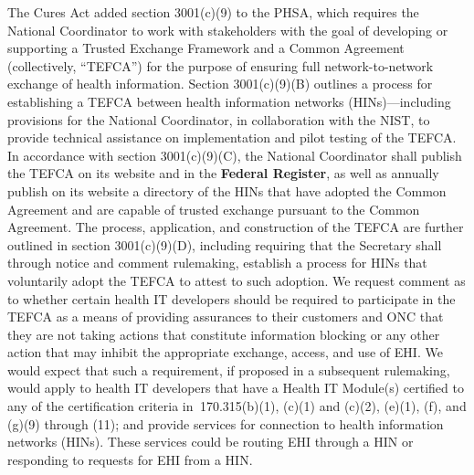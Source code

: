 \documentclass[twoside,11pt]{article}
\begin{document}
          The Cures Act added section 3001(c)(9) to the PHSA, which requires the National Coordinator to work with stakeholders with the goal of developing or supporting a Trusted Exchange Framework and a Common Agreement (collectively, “TEFCA”) for the purpose of ensuring full network-to-network exchange of health information. Section 3001(c)(9)(B) outlines a process for establishing a TEFCA between health information networks (HINs)—including provisions for the National Coordinator, in collaboration with the NIST, to provide technical assistance on implementation and pilot testing of the TEFCA. In accordance with section 3001(c)(9)(C), the National Coordinator shall publish the TEFCA on its website and in the \textbf{Federal Register}, as well as annually publish on its website a directory of the HINs that have adopted the Common Agreement and are capable of trusted exchange pursuant to the Common Agreement. The process, application, and construction of the  \ifhmode\expandafter\xspace\fi TEFCA are further outlined in section 3001(c)(9)(D), including requiring that the Secretary shall through notice and comment rulemaking, establish a process for HINs that voluntarily adopt the TEFCA to attest to such adoption. We request comment as to whether certain health IT developers should be required to participate in the TEFCA as a means of providing assurances to their customers and ONC that they are not taking actions that constitute information blocking or any other action that may inhibit the appropriate exchange, access, and use of EHI. We would expect that such a requirement, if proposed in a subsequent rulemaking, would apply to health IT developers that have a Health IT Module(s) certified to any of the certification criteria in \textsection{}\textsection{} 170.315(b)(1), (c)(1) and (c)(2), (e)(1), (f), and (g)(9) through (11); and provide services for connection to health information networks (HINs). These services could be routing EHI through a HIN or responding to requests for EHI from a HIN.
\end{document}

